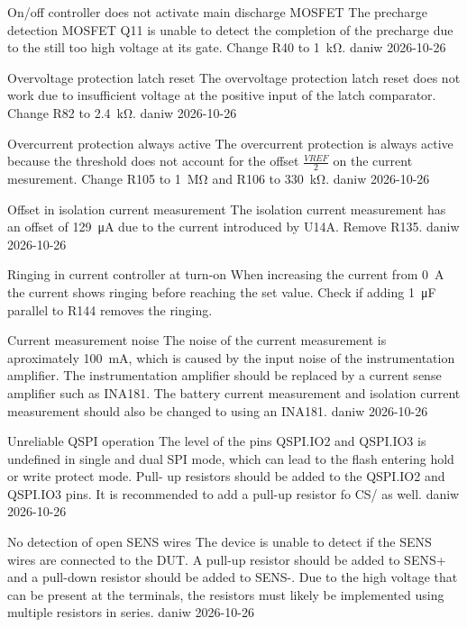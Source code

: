 \begin{ModTable}
\ModItemDone
{On/off controller does not activate main discharge MOSFET}
{The precharge detection MOSFET Q11 is unable to detect the completion of the precharge due to the still too high voltage at its gate. }
{Change R40 to \qty{1}{\kilo\ohm}. }
{daniw}
{2026-10-26}

\ModItemDone
{Overvoltage protection latch reset}
{The overvoltage protection latch reset does not work due to insufficient voltage at the positive input of the latch comparator. }
{Change R82 to \qty{2.4}{\kilo\ohm}. }
{daniw}
{2026-10-26}

\ModItemDone
{Overcurrent protection always active}
{The overcurrent protection is always active because the threshold does not account for the offset $\frac{VREF}{2}$ on the current mesurement. }
{Change R105 to \qty{1}{\mega\ohm} and R106 to \qty{330}{\kilo\ohm}. }
{daniw}
{2026-10-26}

\ModItemDone
{Offset in isolation current measurement}
{The isolation current measurement has an offset of \qty{129}{\micro\ampere} due to the current introduced by U14A. }
{Remove R135. }
{daniw}
{2026-10-26}

\ModItemOpen
{Ringing in current controller at turn-on}
{When increasing the current from \qty{0}{\ampere} the current shows ringing before reaching the set value. }
{Check if adding \qty{1}{\micro\farad} parallel to R144 removes the ringing. }
{}
{}

\ModItemDone
{Current measurement noise}
{The noise of the current measurement is aproximately \qty{100}{\milli\ampere}, which is caused by the input noise of the instrumentation amplifier. }
{The instrumentation amplifier should be replaced by a current sense amplifier such as INA181. The battery current measurement and isolation current measurement should also be changed to using an INA181. }
{daniw}
{2026-10-26}

\ModItemDone
{Unreliable QSPI operation}
{The level of the pins QSPI.IO2 and QSPI.IO3 is undefined in single and dual SPI mode, which can lead to the flash entering hold or write protect mode. }
{Pull- up resistors should be added to the QSPI.IO2 and QSPI.IO3 pins. It is recommended to add a pull-up resistor fo CS/ as well. }
{daniw}
{2026-10-26}

\ModItemDone
{No detection of open SENS wires}
{The device is unable to detect if the SENS wires are connected to the \ac{DUT}. }
{A pull-up resistor should be added to SENS+ and a pull-down resistor should be added to SENS-. Due to the high voltage that can be present at the terminals, the resistors must likely be implemented using multiple resistors in series. }
{daniw}
{2026-10-26}


\end{ModTable}
